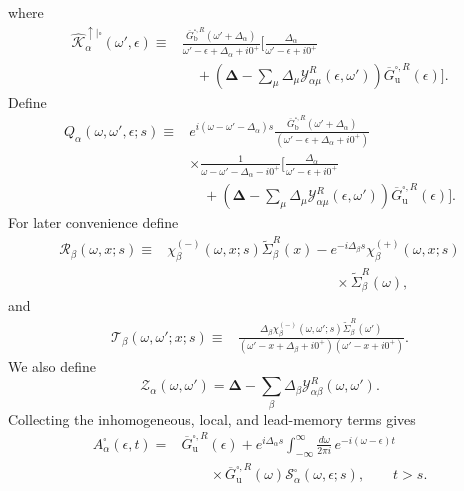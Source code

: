 \documentclass[
 reprint,
 superscriptaddress,
 amsmath,amssymb,
 aps,prb,
 longbibliography,
 floatfix
]{revtex4-2}
\begin{document}
where
\begin{equation*}
\begin{aligned}
\widehat{\mathcal K}_\alpha^{\uparrow|\square}
(\omega',\epsilon)
\equiv{}&
\frac{
\overline G_{\mathrm b}^{\square,R}
(\omega'+\Delta_\alpha)
}
{\omega'-\epsilon+\Delta_\alpha+i0^+}
\Bigg[
\frac{\Delta_\alpha}
{\omega'-\epsilon+i0^+}
\\
&\quad+
\left(
\bm\Delta
-
\sum_\mu
\Delta_\mu
\mathcal Y_{\alpha\mu}^R
(\epsilon,\omega')
\right)
\overline G_{\mathrm u}^{\square,R}(\epsilon)
\Bigg].
\end{aligned}
\end{equation*}
Define
\begin{equation*}
\begin{aligned}
Q_\alpha(\omega,\omega',\epsilon;s)
\equiv{}&
e^{i(\omega-\omega'-\Delta_\alpha)s}
\frac{
\overline G_{\mathrm b}^{\square,R}
(\omega'+\Delta_\alpha)
}
{
(\omega'-\epsilon+\Delta_\alpha+i0^+)
}
\\
&\times
\frac{1}
{\omega-\omega'-\Delta_\alpha-i0^+}
\Bigg[
\frac{\Delta_\alpha}
{\omega'-\epsilon+i0^+}
\\
&\quad+
\left(
\bm\Delta
-
\sum_\mu
\Delta_\mu
\mathcal Y_{\alpha\mu}^R
(\epsilon,\omega')
\right)
\overline G_{\mathrm u}^{\square,R}(\epsilon)
\Bigg].
\end{aligned}
\end{equation*}
For later convenience define
\begin{align*}
\mathcal R_\beta(\omega,x;s)
\equiv{}&
\chi_\beta^{(-)}(\omega,x;s)
\widetilde\Sigma_\beta^R(x)
-
e^{-i\Delta_\beta s}
\chi_\beta^{(+)}(\omega,x;s)
\\
&\qquad\qquad\qquad\qquad\qquad\qquad\times
\widetilde\Sigma_\beta^R(\omega),
\end{align*}
and
\begin{equation*}
\begin{aligned}
\mathcal T_\beta
(\omega,\omega';x;s)
\equiv{}&
\frac{
\Delta_\beta
\chi_\beta^{(-)}
(\omega,\omega';s)
\widetilde\Sigma_\beta^R(\omega')
}
{(
\omega'-x+\Delta_\beta+i0^+
)(\omega'-x+i0^+)}.
\end{aligned}
\end{equation*}
We also define
\begin{equation*}
\mathcal Z_\alpha(\omega,\omega')
=
\bm\Delta
-
\sum_\beta
\Delta_\beta
\mathcal Y_{\alpha\beta}^R
(\omega,\omega').
\end{equation*}
Collecting the inhomogeneous, local, and lead-memory terms gives
\begin{equation}
\boxed{
\begin{aligned}
A_\alpha^\square(\epsilon,t)
={}&
\overline G_{\mathrm u}^{\square,R}(\epsilon)
+
e^{i\Delta_\alpha s}
\int_{-\infty}^{\infty}
\frac{d\omega}{2\pi i}\,
e^{-i(\omega-\epsilon)t}
\\
&\qquad\times
\overline G_{\mathrm u}^{\square,R}(\omega)
\mathcal S_\alpha^\square
(\omega,\epsilon;s),
\qquad t>s.
\end{aligned}}
\label{eq:A-square-final-proof}
\end{equation}
\end{document}
